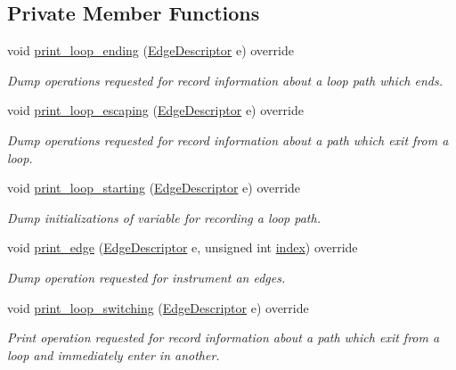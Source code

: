 \subsection*{Private Member Functions}
\begin{DoxyCompactItemize}
\item 
void \hyperlink{classBasicBlocksProfilingCWriter_aa45c57894aba6cedaff580f45cab879b}{print\+\_\+loop\+\_\+ending} (\hyperlink{graph_8hpp_a9eb9afea34e09f484b21f2efd263dd48}{Edge\+Descriptor} e) override
\begin{DoxyCompactList}\small\item\em Dump operations requested for record information about a loop path which ends. \end{DoxyCompactList}\item 
void \hyperlink{classBasicBlocksProfilingCWriter_a152e65459d50c885bcf38b0c87aaaa5d}{print\+\_\+loop\+\_\+escaping} (\hyperlink{graph_8hpp_a9eb9afea34e09f484b21f2efd263dd48}{Edge\+Descriptor} e) override
\begin{DoxyCompactList}\small\item\em Dump operations requested for record information about a path which exit from a loop. \end{DoxyCompactList}\item 
void \hyperlink{classBasicBlocksProfilingCWriter_ae6ce4249d3bbd0d69249445c27d772b9}{print\+\_\+loop\+\_\+starting} (\hyperlink{graph_8hpp_a9eb9afea34e09f484b21f2efd263dd48}{Edge\+Descriptor} e) override
\begin{DoxyCompactList}\small\item\em Dump initializations of variable for recording a loop path. \end{DoxyCompactList}\item 
void \hyperlink{classBasicBlocksProfilingCWriter_a2efe4603c6a9adb508091feb50cabf5f}{print\+\_\+edge} (\hyperlink{graph_8hpp_a9eb9afea34e09f484b21f2efd263dd48}{Edge\+Descriptor} e, unsigned int \hyperlink{tutorial__pact__2019_2Introduction_2third_2include_2Keccak_8h_a028c9bdc8344cca38ab522a337074797}{index}) override
\begin{DoxyCompactList}\small\item\em Dump operation requested for instrument an edges. \end{DoxyCompactList}\item 
void \hyperlink{classBasicBlocksProfilingCWriter_abf73db4344fbaf917e5133dfa9699d27}{print\+\_\+loop\+\_\+switching} (\hyperlink{graph_8hpp_a9eb9afea34e09f484b21f2efd263dd48}{Edge\+Descriptor} e) override
\begin{DoxyCompactList}\small\item\em Print operation requested for record information about a path which exit from a loop and immediately enter in another. \end{DoxyCompactList}\end{DoxyCompactItemize}
